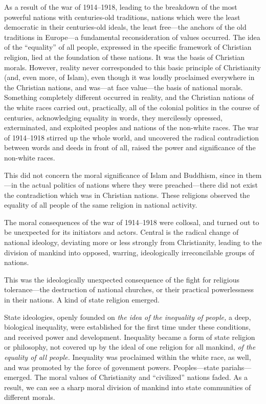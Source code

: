 \Section \label{sec:28}
As a result of the war of 1914--1918, leading to the breakdown of the most
powerful nations with centuries-old traditions, nations which were the least
democratic in their centuries-old ideals, the least free---the anchors of the
old traditions in Europe---a fundamental reconsideration of values occurred.
The idea of the ``equality'' of all people, expressed in the specific framework
of Christian religion, lied at the foundation of these nations.  It was the
basis of Christian morals.  However, reality never corresponded to this basic
principle of Christianity (and, even more, of Islam), even though it was loudly
proclaimed everywhere in the Christian nations, and was---at face value---the
basis of national morals.  Something completely different occurred in reality,
and the Christian nations of the white races carried out, practically, all of
the colonial politics in the course of centuries, acknowledging equality in
words, they mercilessly opressed, exterminated, and exploited peoples and
nations of the non-white races.  The war of 1914--1918 stirred up the whole
world, and uncovered the radical contradiction between words and deeds in front
of all, raised the power and significance of the non-white races.

This did not concern the moral significance of Islam and Buddhism, since in
them---in the actual politics of nations where they were preached---there did
not exist the contradiction which was in Christian nations.  These religions
observed the equality of all people of the same religion in national activity.

The moral consequences of the war of 1914--1918 were collosal, and turned out
to be unexpected for its initiators and actors.  Central is the radical change
of national ideology, deviating more or less strongly from Christianity,
leading to the division of mankind into opposed, warring, ideologically
irreconcilable groups of nations.

This was the ideologically unexpected consequence of the fight for religious
tolerance---the destruction of national churches, or their practical
powerlessness in their nations.  A kind of state religion emerged.

State ideologies, openly founded on \emph{the idea of the inequality of
people,} a deep, biological inequality, were established for the first time
under these conditions, and received power and development.  Inequality became
a form of state religion or philosophy, not covered up by the ideal of one
religion for all mankind, \emph{of the equality of all people.}  Inequality was
proclaimed within the white race, as well, and was promoted by the force of
govenment powers.  Peoples---state pariahs---emerged.  The moral values of
Christianity and ``civilized'' nations faded.  As a result, we can see a sharp
moral division of mankind into state communities of different morals.

